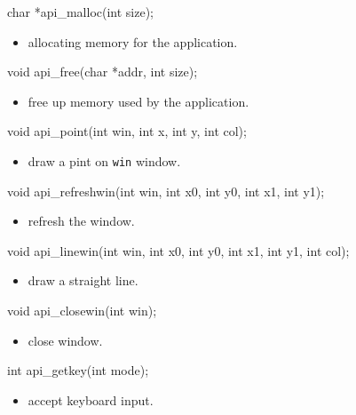 \documentclass{swfcthesis}
\begin{document}
\begin{ccode}
char *api_malloc(int size);
\end{ccode}
\begin{itemize}
\item allocating memory for the application.
\end{itemize}



\begin{ccode}
void api_free(char *addr, int size);
\end{ccode}
\begin{itemize}
\item free up memory used by the application.
\end{itemize}



\begin{ccode}
void api_point(int win, int x, int y, int col);
\end{ccode}
\begin{itemize}
\item draw a pint on \texttt{win} window.
\end{itemize}



\begin{ccode}
void api_refreshwin(int win, int x0, int y0, int x1, int y1);
\end{ccode}
\begin{itemize}
\item refresh the window.
\end{itemize}



\begin{ccode}
void api_linewin(int win, int x0, int y0, int x1, int y1, int col);
\end{ccode}
\begin{itemize}
\item draw a straight line.
\end{itemize}


\begin{ccode}
void api_closewin(int win);
\end{ccode}
\begin{itemize}
\item close window.
\end{itemize}


\begin{ccode}
int api_getkey(int mode);
\end{ccode}
\begin{itemize}
\item accept keyboard input.
\end{itemize}
\end{document}
